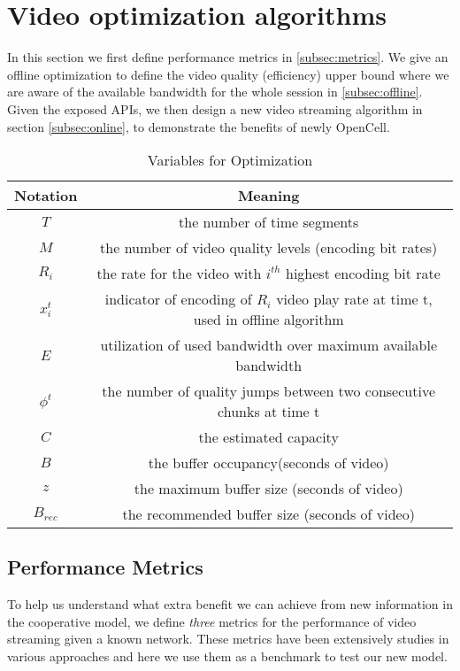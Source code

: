\section{Video optimization algorithms}\label{sec:optimization}
In this section we first define performance metrics in \autoref{subsec:metrics}. We give an offline optimization to define the video quality (efficiency) upper bound where we are aware of the available bandwidth for the whole session in \autoref{subsec:offline}.  Given the exposed APIs, we then design a new video streaming algorithm in section \ref{subsec:online},  to demonstrate the benefits of newly OpenCell.
\begin{table*}
\begin{tabular} {|c |c |}
\hline
Notation&Meaning\\ \hline
$T$ &the number of time segments\\ \hline
$M$ &the number of video quality levels (encoding bit rates)\\ \hline
$R_i$& the rate for the video with $i^{th}$ highest encoding bit rate\\ \hline
$x_i^t$&indicator of encoding of $R_i$ video play rate at time t, used in offline algorithm \\ \hline
$E$& utilization of used bandwidth over maximum available bandwidth \\ \hline
$\phi^t$ &the number of quality jumps between two consecutive chunks at time t\\ \hline
$C $ &the estimated capacity\\ \hline
$B $ &the buffer occupancy(seconds of video) \\ \hline
$z $ &the maximum buffer size (seconds of video) \\ \hline
$B_{rec} $ &the recommended buffer size (seconds of video) \\ \hline
\end{tabular}
\centering
\caption{Variables for Optimization}
\end{table*}


\subsection{Performance Metrics}\label{subsec:metrics}
To help us understand what extra benefit we can achieve from new information in the cooperative model, we define \emph{three} metrics for the performance of video streaming given a known network. These metrics have been extensively studies in various approaches and here we use them as a benchmark to test our new model\cite{Qava, Avis,VideoMeasurement, Festive}.

